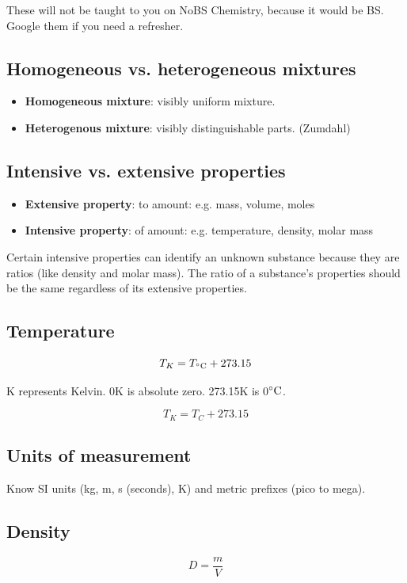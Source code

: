 \documentclass[letterpaper, 12pt]{article}
\begin{document}
These will not be taught to you on NoBS Chemistry, because it would be BS. Google them if you need a refresher.

	\subsection{Homogeneous vs. heterogeneous mixtures}
	\begin{itemize}
		\item \textbf{Homogeneous mixture}: visibly uniform mixture.
		\item \textbf{Heterogenous mixture}: visibly distinguishable parts. (Zumdahl)
	\end{itemize}

	\subsection{Intensive vs. extensive properties}
	\begin{itemize}
		\item \textbf{Extensive property}:  to amount: e.g. mass, volume, moles
		\item \textbf{Intensive property}:  of amount: e.g. temperature, density, molar mass
	\end{itemize}

	Certain intensive properties can identify an unknown substance because they are ratios (like density and molar mass). The ratio of a substance's properties should be the same regardless of its extensive properties.

	\subsection{Temperature}
	$$T_{K} = T_{^{\circ}{\rm C}} + 273.15$$
	
	K represents Kelvin. 0K is absolute zero. 273.15K is 0$^{\circ}{\rm C}$.

	$$T_{K} = T_{C} + 273.15$$

	\subsection{Units of measurement}
	Know SI units (kg, m, s (seconds), K) and metric prefixes (pico to mega).

	\subsection{Density}
	$$D = \frac{m}{V}$$
\end{document}
